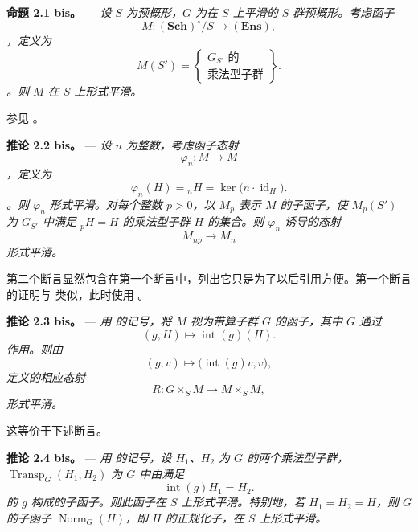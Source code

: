 \medskip\noindent{}\textbf{命题 2.1 bis。} --- \textit{设 \(S\) 为预概形，\(G\) 为在 \(S\) 上平滑的 \(S\)-群预概形。考虑函子}  \[
  M:(\mathbf{Sch})^\circ/S\longrightarrow(\mathbf{Ens}),
\]\textit{，定义为}  \[
  M(S')
  =\left\{
    \begin{array}{c}
      \text{\(G_{S'}\) 的}\\[-2pt]
      \text{乘法型子群}
    \end{array}
  \right\}.
\]\textit{。则 \(M\) 在 \(S\) 上形式平滑。}

参见 。

\medskip\noindent{}\textbf{推论 2.2 bis。} --- \textit{设 \(n\) 为整数，考虑函子态射}  \[
  \varphi_n:M\longrightarrow M
\]\textit{，定义为}  \[
  \varphi_n(H)={}_nH=\ker\!\bigl(n\cdot\operatorname{id}_H\bigr).
\]\textit{。则 \(\varphi_n\) 形式平滑。对每个整数 \(p>0\)，以 \(M_p\) 表示 \(M\) 的子函子，使 \(M_p(S')\) 为 \(G_{S'}\) 中满足 \({}_pH=H\) 的乘法型子群 \(H\) 的集合。则 \(\varphi_n\) 诱导的态射}  \[
  M_{np}\longrightarrow M_n
\]\textit{形式平滑。}

第二个断言显然包含在第一个断言中，列出它只是为了以后引用方便。第一个断言的证明与  类似，此时使用 。

\medskip\noindent{}\textbf{推论 2.3 bis。} --- \textit{用  的记号，将 \(M\) 视为带算子群 \(G\) 的函子，其中 \(G\) 通过 \[
  (g,H)\longmapsto\operatorname{int}(g)(H).
\] 作用。则由 \[
  (g,v)\longmapsto\bigl(\operatorname{int}(g)v,v\bigr),
\] 定义的相应态射}  \[
  R:G\times_S M\longrightarrow M\times_S M,
\]\textit{形式平滑。}

这等价于下述断言。

\medskip\noindent{}\textbf{推论 2.4 bis。} --- \textit{用  的记号，设 \(H_1\)、\(H_2\) 为 \(G\) 的两个乘法型子群，\(\operatorname{Transp}_G(H_1,H_2)\) 为 \(G\) 中由满足 \[
  \operatorname{int}(g)H_1=H_2.
\] 的 \(g\) 构成的子函子。则此函子在 \(S\) 上形式平滑。特别地，若 \(H_1=H_2=H\)，则 \(G\) 的子函子 \(\operatorname{Norm}_G(H)\)，即 \(H\) 的正规化子，在 \(S\) 上形式平滑。}

